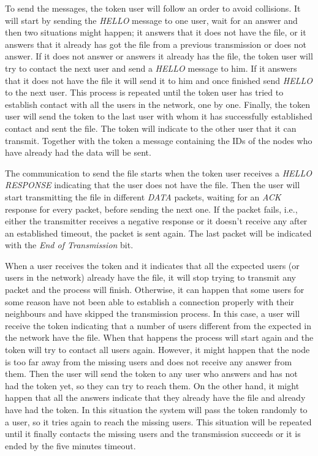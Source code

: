To send the messages, the token user will follow an order to avoid collisions. It will start by sending the \textit{HELLO} message to one user, wait for an answer and then two situations might happen; it answers that it does not have the file, or it answers that it already has got the file from a previous transmission or does not answer. If it does not answer or answers it already has the file, the token user will try to contact the next user and send a \textit{HELLO} message to him. If it answers that it does not have the file it will send it to him and once finished send \textit{HELLO} to the next user. This process is repeated until the token user has tried to establish contact with all the users in the network, one by one. Finally, the token user will send the token to the last user with whom it has successfully established contact and sent the file. The token will indicate to the other user that it can transmit. Together with the token a message containing the IDs of the nodes who have already had the data will be sent.


The communication to send the file starts when the token user receives a \textit{HELLO RESPONSE} indicating that the user does not have the file. Then the user will start transmitting the file in different \textit{DATA} packets, waiting for an \textit{ACK} response for every packet, before sending the next one. If the packet fails, i.e., either the transmitter receives a negative response or it doesn’t receive any after an established timeout, the packet is sent again. The last packet will be indicated with the \textit{End of Transmission} bit.

When a user receives the token and it indicates that all the expected users (or users in the network) already have the file, it will stop trying to transmit any packet and the process will finish. Otherwise, it can happen that some users for some reason have not been able to establish a connection properly with their neighbours and have skipped the transmission process. In this case, a user will receive the token indicating that a number of users different from the expected in the network have the file. When that happens the process will start again and the token will try to contact all users again. However, it might happen that the node is too far away from the missing users and does not receive any answer from them. Then the user will send the token to any user who answers and has not had the token yet, so they can try to reach them. On the other hand, it might happen that all the answers indicate that they already have the file and already have had the token. In this situation the system will pass the token randomly to a user, so it tries again to reach the missing users. This situation will be repeated until it finally contacts the missing users and the transmission succeeds or it is ended by the five minutes timeout.




